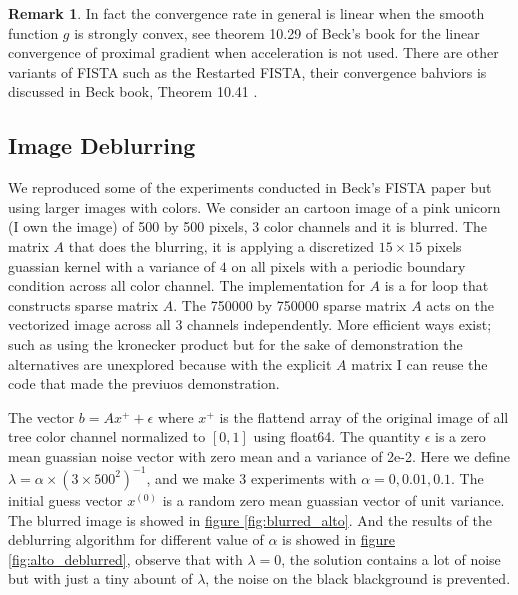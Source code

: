 \documentclass[]{article}
\theoremstyle{definition}
\newtheorem{remark}{Remark}[subsection]
{
    \newtheorem{assumption}{Assumption}
}
\begin{document}
        \begin{remark}
            In fact the convergence rate in general is linear when the smooth function $g$ is strongly convex, see theorem 10.29 of Beck's book\cite{book:first_order_opt} for the linear convergence of proximal gradient when acceleration is not used. There are other variants of FISTA such as the Restarted FISTA, their convergence bahviors is discussed in Beck book, Theorem 10.41 \cite{book:first_order_opt}.     
        \end{remark}
        
        
    \subsection*{Image Deblurring}
        We reproduced some of the experiments conducted in Beck's FISTA paper \cite{paper:FISTA} but using larger images with colors. We consider an cartoon image of a pink unicorn (I own the image) of 500 by 500 pixels, 3 color channels and it is blurred. The matrix $A$ that does the blurring, it is applying a discretized $15\times 15$ pixels guassian kernel with a variance of $4$ on all pixels with a periodic boundary condition across all color channel. The implementation for $A$ is a for loop that constructs sparse matrix $A$. The 750000 by 750000 sparse matrix $A$ acts on the vectorized image across all 3 channels independently. More efficient ways exist; such as using the kronecker product but for the sake of demonstration the alternatives are unexplored because with the explicit $A$ matrix I can reuse the code that made the previuos demonstration. 
        \par
        The vector $b = Ax^+ + \epsilon$ where $x^+$ is the flattend array of the original image of all tree color channel normalized to $[0, 1]$ using float64. The quantity $\epsilon$ is a zero mean guassian noise vector with zero mean and a variance of 2e-2. Here we define $\lambda = \alpha\times (3\times500^2)^{-1}$, and we make 3 experiments with $\alpha = 0, 0.01, 0.1$. The initial guess vector $x^{(0)}$ is a random zero mean guassian vector of unit variance. The blurred image is showed in \hyperref[fig:blurred_alto]{figure \ref*{fig:blurred_alto}}. And the results of the deblurring algorithm for different value of $\alpha$ is showed in \hyperref[fig:alto_deblurred]{figure \ref*{fig:alto_deblurred}}, observe that with $\lambda = 0$, the solution contains a lot of noise but with just a tiny abount of $\lambda$, the noise on the black blackground is prevented. 
\end{document}
